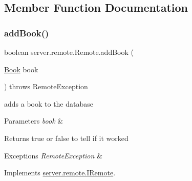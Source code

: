 \subsection{Member Function Documentation}
\mbox{\label{classserver_1_1remote_1_1_remote_a496fcecd259c1b527ffba62fc452afee}} 
\subsubsection{\texorpdfstring{add\+Book()}{addBook()}\hspace{0.1cm}{\footnotesize\ttfamily [1/2]}}
{\footnotesize\ttfamily boolean server.\+remote.\+Remote.\+add\+Book (\begin{DoxyParamCaption}\item[{\hyperlink{classserver_1_1data_1_1_book}{Book}}]{book }\end{DoxyParamCaption}) throws Remote\+Exception}

adds a book to the database 
\begin{DoxyParams}{Parameters}
{\em book} & \\
\hline
\end{DoxyParams}
\begin{DoxyReturn}{Returns}
true or false to tell if it worked 
\end{DoxyReturn}

\begin{DoxyExceptions}{Exceptions}
{\em Remote\+Exception} & \\
\hline
\end{DoxyExceptions}


Implements \hyperlink{interfaceserver_1_1remote_1_1_i_remote_a3b11a0e182873e445ec8546394e36373}{server.\+remote.\+I\+Remote}.

\mbox{\label{classserver_1_1remote_1_1_remote_afd807d8743560106c61a01094795c9cb}} 
